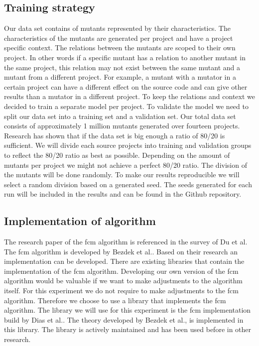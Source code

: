 \documentclass[../../main]{subfiles}
\begin{document}
\subsection{Training strategy}
\label{ch:training_strategy}
Our data set contains of mutants represented by their characteristics. 
The characteristics of the mutants are generated per project and have a project specific context.
The relations between the mutants are scoped to their own project. 
In other words if a specific mutant has a relation to another mutant in the same project, this relation may not exist between the same mutant and a mutant from a different project.
For example, a mutant with a mutator in a certain project can have a different effect on the source code and can give other results than a mutator in a different project.
To keep the relations and context we decided to train a separate model per project.
\newline
To validate the model we need to split our data set into a training set and a validation set.
Our total data set consists of approximately 1 million mutants generated over fourteen projects.
Research has shown that if the data set is big enough a ratio of 80/20 is sufficient\cite{Guyon1997ARatio}.
We will divide each source projects into training and validation groups to reflect the 80/20 ratio as best as possible.
Depending on the amount of mutants per project we might not achieve a perfect 80/20 ratio.
The division of the mutants will be done randomly. 
To make our results reproducible we will select a random division based on a generated seed.
The seeds generated for each run will be included in the results and can be found in the Github repository\cite{rbasarat-repo}.

\subsection{Implementation of algorithm}
\label{ch:fcm_implementation}
The research paper of the \acrshort{fcm} algorithm is referenced in the survey of Du et al\cite{Du2010Clustering:Approach}.
The \acrshort{fcm} algorithm is developed by Bezdek et al.\cite{Bezdek1984FCM:Algorithm}.
Based on their research an implementation can be developed.
There are existing libraries that contain the implementation of the \acrshort{fcm} algorithm.
Developing our own version of the \acrshort{fcm} algorithm would be valuable if we want to make adjustments to the algorithm itself.
For this experiment we do not require to make adjustments to the \acrshort{fcm} algorithm.
Therefore we choose to use a library that implements the \acrshort{fcm} algorithm.
The library we will use for this experiment is the \acrlong{fcm} implementation build by Dias et al.\cite{dias2019fuzzy}.
The theory developed by Bezdek et al., is implemented in this library.
The library is actively maintained and has been used before in other research\cite{DeAlmeidaNeto2020, Kopf2019, Nwadiugwu2020}.
\end{document}
